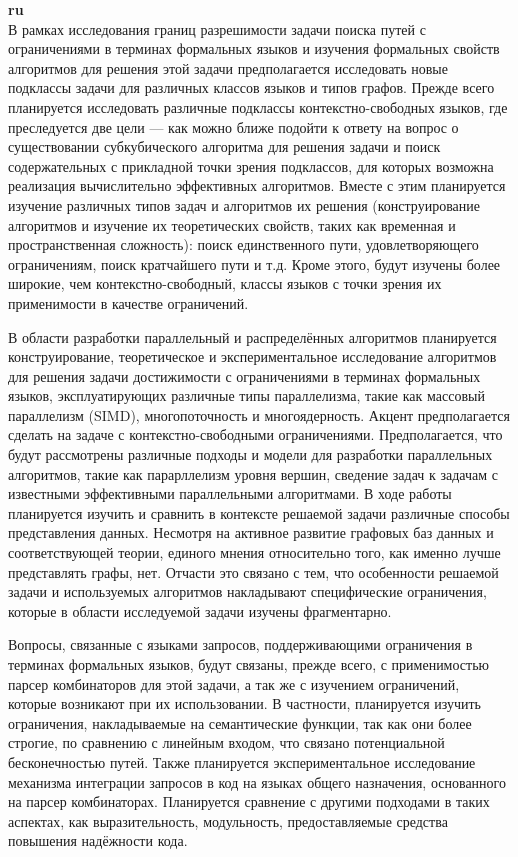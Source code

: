 \documentclass[12pt]{article}  %
\theoremstyle{remark}
\begin{document}
\textbf{ru}\\
%
В рамках исследования границ разрешимости задачи поиска путей с ограничениями в терминах формальных языков и изучения формальных свойств алгоритмов для решения этой задачи предполагается исследовать новые подклассы задачи для различных классов языков и типов графов. Прежде всего планируется исследовать различные подклассы контекстно-свободных языков, где преследуется две цели --- как можно ближе подойти к ответу на вопрос о существовании субкубического алгоритма для решения задачи и поиск содержательных с прикладной точки зрения подклассов, для которых возможна реализация вычислительно эффективных алгоритмов. Вместе с этим планируется изучение различных типов задач и алгоритмов их решения (конструирование алгоритмов и изучение их теоретических свойств, таких как временная и пространственная сложность): поиск единственного пути, удовлетворяющего ограничениям, поиск кратчайшего пути и т.д. Кроме этого, будут изучены более широкие, чем контекстно-свободный, классы языков с точки зрения их применимости в качестве ограничений.

В области разработки параллельный и распределённых алгоритмов планируется конструирование, теоретическое и экспериментальное исследование алгоритмов для решения задачи достижимости с ограничениями в терминах формальных языков, эксплуатирующих различные типы параллелизма, такие как массовый параллелизм (SIMD), многопоточность и многоядерность. Акцент предполагается сделать на задаче с контекстно-свободными ограничениями. Предполагается, что будут рассмотрены различные подходы и модели для разработки параллельных алгоритмов, такие как парарллелизм уровня вершин, сведение задач к задачам с известными эффективными параллельными алгоритмами. В ходе работы планируется изучить и сравнить в контексте решаемой задачи различные способы представления данных. Несмотря на активное развитие графовых баз данных и соответствующей теории, единого мнения относительно того, как именно лучше представлять графы, нет. Отчасти это связано с тем, что особенности решаемой задачи и используемых алгоритмов накладывают специфические ограничения, которые в области исследуемой задачи изучены фрагментарно.

Вопросы, связанные с языками запросов, поддерживающими ограничения в терминах формальных языков, будут связаны, прежде всего, с применимостью парсер комбинаторов для этой задачи, а так же с изучением ограничений, которые возникают при их использовании. В частности, планируется изучить ограничения, накладываемые на семантические функции, так как они более строгие, по сравнению с линейным входом, что связано потенциальной бесконечностью путей. Также планируется экспериментальное исследование механизма интеграции запросов в код на языках общего назначения, основанного на парсер комбинаторах. Планируется сравнение с другими подходами в таких аспектах, как выразительность, модульность, предоставляемые средства повышения надёжности кода.
\end{document}
